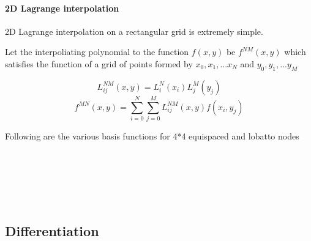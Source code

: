 \documentclass[11pt]{article}
\begin{document}
    \paragraph{2D Lagrange interpolation}\label{d-lagrange-interpolation}

2D Lagrange interpolation on a rectangular grid is extremely simple.

Let the interpoliating polynomial to the function \(f(x,y)\) be
\(f^{NM}(x,y)\) which satisfies the function of a grid of points formed
by \(x_0, x_1, ... x_N\) and \(y_0, y_1, ... y_M\)

\[L_{ij}^{NM}(x,y) = L_i^{N}(x_i) L_j^{M}(y_j)\]
\[f^{MN}(x,y) = \sum_{i=0}^{N} \sum_{j=0}^{M} L_{ij}^{NM}(x,y) f(x_i,y_j)\]

    Following are the various basis functions for 4*4 equispaced and lobatto
nodes



    \begin{center}
    \end{center}
    { \hspace*{\fill} \\}
    
    \begin{center}
    \end{center}
    { \hspace*{\fill} \\}
    


    \begin{center}
    \end{center}
    { \hspace*{\fill} \\}
    
    \subsection{Differentiation}\label{differentiation}
\end{document}
